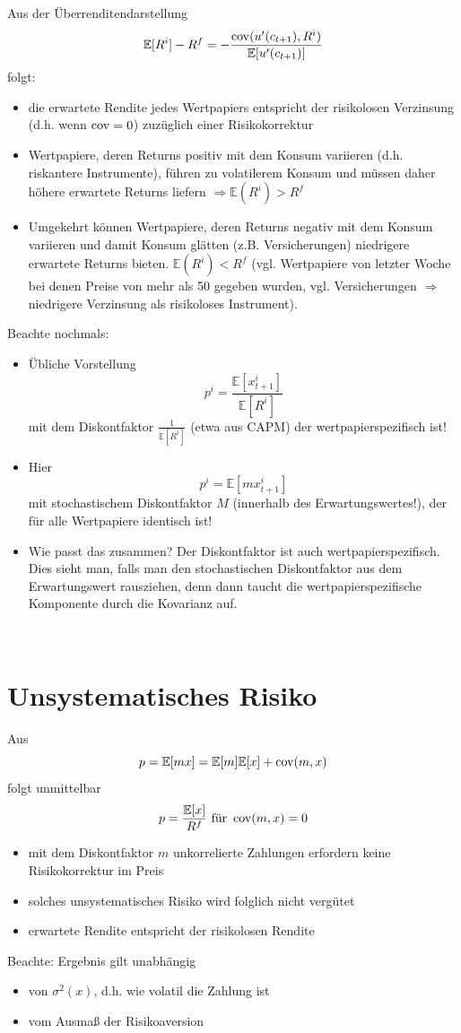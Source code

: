 \documentclass[12pt]{extreport} %
\theoremstyle{named}
\theoremstyle{nnamed}
\theoremstyle{itshape}
\theoremstyle{normal}
\begin{document}
Aus der Überrenditendarstellung 
		$$ \mathbb{E}[R^i] - R^f = -\frac{\operatorname{cov}(u'(c_{t+1}), R^i)}{\mathbb{E}[u'(c_{t+1})]} $$
folgt:
\begin{itemize}
	\item die erwartete Rendite jedes Wertpapiers entspricht der risikolosen Verzinsung (d.h. wenn $\operatorname{cov} = 0$) zuzüglich einer Risikokorrektur
	\item Wertpapiere, deren Returns positiv mit dem Konsum variieren (d.h. riskantere Instrumente), führen zu volatilerem Konsum und müssen daher höhere erwartete Returns liefern $\Rightarrow \mathbb{E}(R^i) > R^f$
	\item Umgekehrt können Wertpapiere, deren Returns negativ mit dem Konsum variieren und damit Konsum glätten (z.B. Versicherungen) niedrigere erwartete Returns bieten. $\mathbb{E}(R^i) < R^f$ (vgl. Wertpapiere von letzter Woche bei denen Preise von mehr als 50 gegeben wurden, vgl. Versicherungen $\Rightarrow$ niedrigere Verzinsung als risikoloses Instrument).
\end{itemize}

Beachte nochmals:
\begin{itemize}
	\item Übliche Vorstellung
		$$ p^i = \frac{\mathbb{E}[x_{t+1}^i]}{\mathbb{E} \left[R^i \right]} $$
		mit dem Diskontfaktor $\frac{1}{\mathbb{E} \left[ R^i \right]}$ (etwa aus CAPM) der wertpapierspezifisch ist!
	\item Hier
		$$ p^i = \mathbb{E}[m x_{t+1}^i] $$
		mit stochastischem Diskontfaktor $M$ (innerhalb des Erwartungswertes!), der für alle Wertpapiere identisch ist!
	\item Wie passt das zusammen? Der Diskontfaktor ist auch wertpapierspezifisch. Dies sieht man, falls man den stochastischen Diskontfaktor aus dem Erwartungswert rausziehen, denn dann taucht die wertpapierspezifische Komponente durch die Kovarianz auf.
\end{itemize}

~\newpage

\section{Unsystematisches Risiko}

Aus 
$$ p = \mathbb{E}[mx] = \mathbb{E}[m] \mathbb{E} [x] + \operatorname{cov}(m,x)$$
folgt unmittelbar
$$ p = \frac{\mathbb{E}[x]}{R^f} \text{ für } \operatorname{cov}(m, x) = 0 $$
\begin{itemize}
	\item mit dem Diskontfaktor $m$ unkorrelierte Zahlungen erfordern keine Risikokorrektur im Preis
	\item solches unsystematisches Risiko wird folglich nicht vergütet
	\item erwartete Rendite entspricht der risikolosen Rendite
\end{itemize}
Beachte: Ergebnis gilt unabhängig
\begin{itemize}
	\item von $\sigma^2(x)$, d.h. wie volatil die Zahlung ist
	\item vom Ausmaß der Risikoaversion
\end{itemize}
\end{document}
